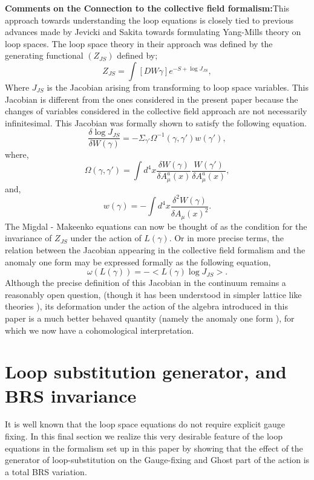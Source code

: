 \documentclass[a4paper,12]{article}
\begin{document}
{\bf Comments on the Connection to the  collective field formalism:}This approach towards understanding the 
loop 
equations is closely tied to previous advances made  by Jevicki and Sakita 
\cite{Collective1, Collective2, 
Collective3, Collective4} towards formulating Yang-Mills theory on loop 
spaces. The loop space theory in their approach was defined by the generating functional $(Z_{JS})$ defined 
by\cite{Collective4};
\begin{equation}
Z_{JS} = \int [DW{\gamma }] e^{-S + \log J_{JS}},
\end{equation}
Where $ J _{JS}$ is the Jacobian arising from transforming to loop space variables. This Jacobian is different 
from the ones considered in the present paper because the changes of variables considered in the collective 
field approach are not necessarily infinitesimal. This Jacobian was formally shown to satisfy the following 
equation.
\begin{equation}
\frac{\delta \log J_{JS}}{\delta W(\gamma )} = -\Sigma _{\gamma '}\Omega ^{-1}(\gamma , \gamma ')w(\gamma '),
\end{equation}
where,
\begin{equation}
\Omega (\gamma, \gamma ') = \int d^4x\frac{\delta W(\gamma )}{\delta A^a_\mu (x)}\frac{W(\gamma ')}{\delta 
A^a_\mu (x)},
\end{equation}
and,
\begin{equation}
w(\gamma ) = -\int d^4 x \frac{\delta ^2 W(\gamma )}{\delta A_\mu (x)^2}.
\end{equation}
The Migdal - Makeenko equations can now be thought of as the condition for the invariance of $Z_{JS}$ under 
the action of $L(\gamma )$. Or in more precise terms, the relation between the Jacobian appearing in the 
collective field formalism and the anomaly one form may be expressed formally as the following equation,
\begin{equation}
\omega (L(\gamma )) = -<L(\gamma )\log J _{JS}>.
\end{equation} 
Although the precise definition of this Jacobian in the continuum remains a reasonably open question, 
(though it has 
been understood in simpler lattice like theories \cite{Collective3, 
entropy, Yaffe1}), its deformation under the 
action of the algebra introduced 
in this paper is a much better behaved quantity (namely the anomaly one form ), for which we now have a 
cohomological interpretation.

\section{Loop substitution generator, and BRS invariance}
It is well known that the loop space equations do not require explicit 
gauge fixing. 
In this final section we realize this very desirable feature of the loop 
equations in the formalism set up in this paper by showing  that the 
effect of the generator 
of loop-substitution on the Gauge-fixing and Ghost part of the action is 
 a total BRS variation.\\
\end{document}
